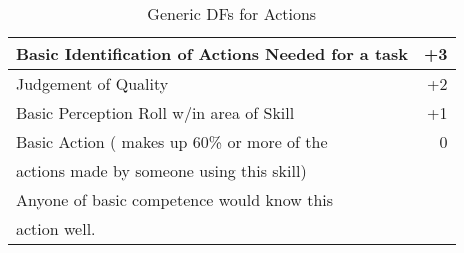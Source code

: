 \begin{table}
	\begin{tabular}{lr}
	Basic Identification of Actions Needed for a task & +3	\\ 
\hline
	Judgement of Quality                          & +2	\\
	Basic Perception Roll w/in area of Skill      & +1	\\
	Basic Action ( makes up 60\% or more of the   & 0	\\  
	actions made by someone using this skill)     &      \\
	Anyone of basic competence would know this   &      \\
	action well.                                  &      \\
	\end{tabular}
    \caption{Generic DFs for Actions}\label{Table:GenericDFs}
\end{table}
